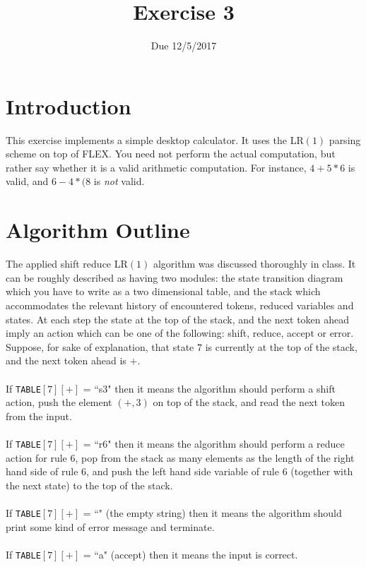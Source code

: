\documentclass{article}
\begin{document}
\title{Exercise 3}
\date{Due 12/5/2017}
\maketitle

\section{Introduction}
This exercise implements a simple desktop calculator.
It uses the LR$(1)$ parsing scheme on top of FLEX.
You need not perform the actual computation, but rather say
whether it is a valid arithmetic computation.
For instance, $4+5*6$ is valid, and $6-4*(8$
is \textit{not} valid.

\section{Algorithm Outline}
The applied shift reduce LR$(1)$ algorithm was discussed thoroughly in class.
It can be roughly described as having two modules:
the state transition diagram which you have to write as a two dimensional table,
and the stack which accommodates the relevant history of encountered tokens, reduced variables and states. At each step the state at the top of the stack, and the next token
ahead imply an action which can be one of the following: shift, reduce, accept or error.
Suppose, for sake of explanation, that state $7$ is currently at the top of the stack, and the next token ahead is $+$. \\ \\
If \verb"TABLE"$[7][+]$ = ``s3" then it means the algorithm should
perform a shift action, push the element $(+,3)$ on top of the stack, and read the next token from the input.\\ \\
If \verb"TABLE"$[7][+]$ = ``r6" then it means the algorithm should
perform a reduce action for rule $6$, pop from the stack as many elements as
the length of the right hand side of rule $6$, and push the left hand side variable of rule $6$ (together with the next state) to the top of the stack.\\ \\
If \verb"TABLE"$[7][+]$ = ``" (the empty string) then it means the algorithm should
print some kind of error message and terminate.\\ \\
If \verb"TABLE"$[7][+]$ = ``a" (accept) then it means the input is correct.\\ \\
\end{document}
